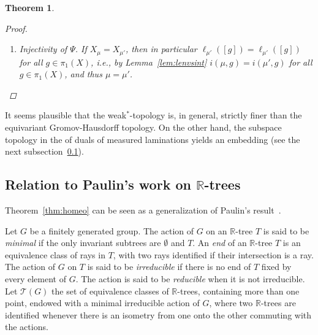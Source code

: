 \documentclass[12pt,article]{amsart}
\numberwithin{equation}{section}
\numberwithin{figure}{section}
\newtheorem{theorem}[equation]{Theorem}
\theoremstyle{definition}
\theoremstyle{plain}
\DeclareMathOperator{\Curr}{Curr}
\renewcommand{\epsilon}{\varepsilon}
\begin{document}
\begin{theorem}
\begin{proof}
\begin{enumerate}
Note that by
\[
|\mu'(G(\overline{x}^*,\overline{y}^*))-\mu(G(\overline{x}^*,\overline{y}^*))| < \epsilon/2
\]
and the choice of $x_i^* \in K^*$ in relation to $x_i \in K$, it follows that
\[
|d_{\mu'}(x',y')-d_{\mu}(x,y)| < \epsilon.
\]
Thus, the first condition of the $\epsilon$-relation is satisfied.
As for the second condition, $g(x) \in K$ means, by equivariance of $\pi_{\mu}$, that $g(\pi_{\mu}(\overline{x}))=\pi_{\mu}(g \overline{x}) \in K$.
Thus,
\[
g \overline{x} \in \pi_{\mu}^{-1}(K),
\]
and hence, by equivariance of $\pi_{\mu'}$, we have
\[
g(x')=\pi_{\mu'}(g \overline{x}) \in K'
\]
which shows that $g(x) \mathcal{R} g(x')$ and $g(x') \in K'$, as we wanted.
Thus, $X_{\mu'} \in U(X,K,P,\epsilon)$.
This shows continuity of $\Psi$ with respect to the topology in $\Curr(X)$ induced by the subbasis of Proposition~\ref{prop:weakflow}. Since that topology is coarser than the weak$^*$-topology, this proves continuity of $\Psi$.

\item Injectivity of $\Psi$. If $X_{\mu}=X_{\mu'}$, then in particular  $\ell_{\mu'}([g])=\ell_{\mu'}([g])$ for all $g \in \pi_1(X)$, i.e., by Lemma~\ref{lem:lenvsint} $i(\mu, g) = i(\mu',g)$ for all $g \in \pi_1(X)$, and thus $\mu=\mu'$.
\end{enumerate}
\end{proof}
\end{theorem}

It seems plausible that the weak$^*$-topology is, in general, strictly finer than the equivariant Gromov-Hausdorff topology.
On the other hand, the subspace topology in the of duals of measured laminations yields an embedding (see the next subsection~\ref{subsec:paulin}). 

\subsection{Relation to Paulin's work on $\mathbb{R}$-trees}
\label{subsec:paulin}
Theorem~\ref{thm:homeo} can be seen as a generalization of Paulin's result~\cite[Main~Theorem]{Pa89:Paulin1989TheGT}.

Let $G$ be a finitely generated group. The action of $G$ on an $\mathbb{R}$-tree $T$ is said to be \emph{minimal} if the only
invariant subtrees are $\emptyset$ and $T$.
An \emph{end} of an $\mathbb{R}$-tree $T$ is an equivalence class of rays in $T$, with two rays identified
if their intersection is a ray. The action of $G$ on $T$ is said to be \emph{irreducible}
if there is no end of $T$ fixed by every element of $G$.
The action is said to be \emph{reducible} when it is not irreducible. 
Let $\mathcal{T}(G)$
 the set of equivalence classes of $\mathbb{R}$-trees, containing more than one point, endowed with a minimal irreducible action of $G$, where two $\mathbb{R}$-trees are identified whenever there is an isometry from one onto the other
commuting with the actions.
\end{document}
